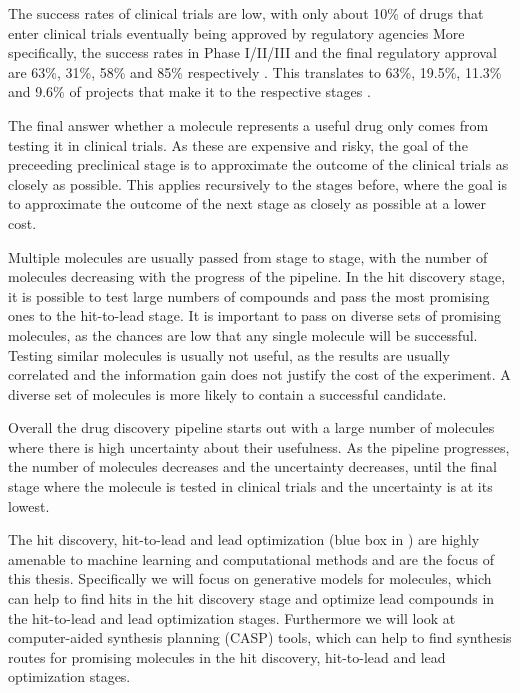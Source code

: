 The success rates of clinical trials are low, with only about 10\% of drugs that
enter clinical trials eventually being approved by regulatory agencies
More specifically, the success rates in Phase I/II/III and the final 
regulatory approval are 63\%, 31\%, 58\% and 85\% respectively 
\citep{mullardParsingClinicalSuccess2016}. This translates to
63\%, 19.5\%, 11.3\% and 9.6\% of projects that make it to the respective stages
\citep{mullardParsingClinicalSuccess2016}. 

The final answer whether a molecule represents a useful drug only comes from
testing it in clinical trials. As these are expensive and risky, the goal of the
preceeding preclinical stage is to approximate the outcome of the clinical
trials as closely as possible. This applies recursively to the stages before,
where the goal is to approximate the outcome of the next stage as closely as
possible at a lower cost. 

Multiple molecules are usually passed from stage to stage, with the number of
molecules decreasing with the progress of the pipeline. 
In the hit discovery stage, it is possible to test large numbers of 
compounds and pass the most promising ones to the hit-to-lead stage.
It is important to pass on diverse sets of promising molecules, as 
the chances are low that any single molecule will be successful.
Testing similar molecules is usually not useful, as the results are 
usually correlated and the information gain does not justify the
cost of the experiment. A diverse set of molecules is more likely to
contain a successful candidate.

Overall the drug discovery pipeline starts out with a large number 
of molecules where there is high uncertainty about their usefulness.
As the pipeline progresses, the number of molecules decreases and
the uncertainty decreases, until the final stage
where the molecule is tested in clinical trials and the uncertainty
is at its lowest.

The hit discovery, hit-to-lead and lead optimization (blue box in
) are highly amenable to machine learning and
computational methods and are the focus of this thesis. Specifically 
we will focus on generative models for molecules, which can help to 
find hits in the hit discovery stage and optimize lead compounds in the
hit-to-lead and lead optimization stages. Furthermore we will look at 
computer-aided synthesis planning (CASP) tools, which can help to find
synthesis routes for promising molecules in the hit discovery, hit-to-lead and lead optimization
stages.

